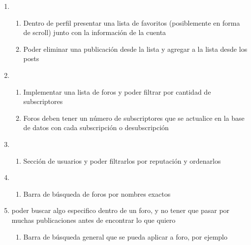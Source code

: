 \documentclass[12pt, letterpaper, notitlepage]{article}
\begin{document}
\begin{enumerate}
		\item {}
		\begin{enumerate}
			\item Dentro de perfil presentar una lista de favoritos (posiblemente en forma de scroll) junto con la información de la cuenta
			\item Poder eliminar una publicación desde la lista y agregar a la lista desde los posts
		\end{enumerate}
		
		
		\item {}
		\begin{enumerate}
			\item Implementar una lista de foros y poder filtrar por cantidad de subscriptores
			\item Foros deben tener un número de subscriptores que se actualice en la base de datos con cada subscripción o desubscripción
		\end{enumerate}
		
		
		\item {}
		\begin{enumerate}
			\item Sección de usuarios y poder filtrarlos por reputación y ordenarlos
		\end{enumerate}
		
		
		\item {}
		\begin{enumerate}
			\item Barra de búsqueda de foros por nombres exactos
		\end{enumerate}
		
		
		\item {}
		{poder buscar algo especifico dentro de un foro, y no tener que pasar por muchas publicaciones antes de encontrar lo que quiero}
		\begin{enumerate}
			\item Barra de búsqueda general que se pueda aplicar a foro, por ejemplo 
		\end{enumerate}
		

\end{enumerate}
\end{document}

